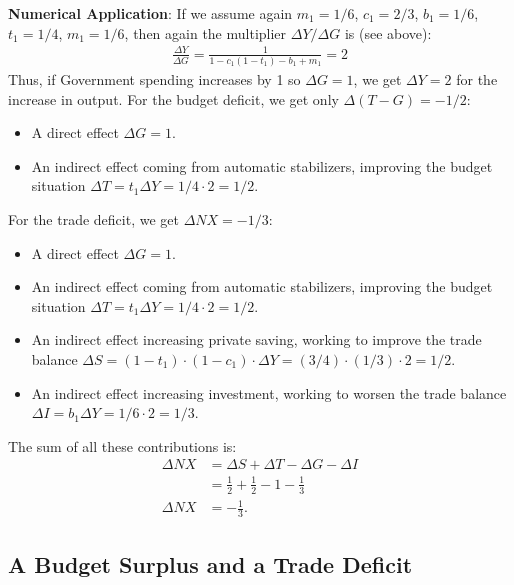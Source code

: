 \documentclass[]{book}
\providecommand{\tightlist}{%
  \setlength{\itemsep}{0pt}\setlength{\parskip}{0pt}}
\theoremstyle{definition}
\theoremstyle{definition}
\theoremstyle{definition}
\theoremstyle{remark}
\begin{document}
\textbf{Numerical Application}: If we assume again \(m_1=1/6\),
\(c_1=2/3\), \(b_1=1/6\), \(t_1=1/4\), \(m_1=1/6\), then again the
multiplier \(\Delta Y/\Delta G\) is (see above): \[
\begin{aligned}
\frac{\Delta Y}{\Delta G}=\frac{1}{1-c_1(1-t_1)-b_1+m_1}=2
\end{aligned}
\] Thus, if Government spending increases by 1 so \(\Delta G = 1\), we
get \(\Delta Y=2\) for the increase in output. For the budget deficit,
we get only \(\Delta(T-G)=-1/2\):

\begin{itemize}
\tightlist
\item
  A direct effect \(\Delta G=1\).
\item
  An indirect effect coming from automatic stabilizers, improving the
  budget situation \(\Delta T = t_1 \Delta Y =1/4\cdot2=1/2\).
\end{itemize}

For the trade deficit, we get \(\Delta NX = -1/3\):

\begin{itemize}
\tightlist
\item
  A direct effect \(\Delta G=1\).
\item
  An indirect effect coming from automatic stabilizers, improving the
  budget situation \(\Delta T = t_1 \Delta Y =1/4\cdot2=1/2\).
\item
  An indirect effect increasing private saving, working to improve the
  trade balance
  \(\Delta S = (1-t_1)\cdot(1-c_1)\cdot\Delta Y=(3/4)\cdot( 1/3) \cdot 2=1/2\).
\item
  An indirect effect increasing investment, working to worsen the trade
  balance \(\Delta I = b_1 \Delta Y = 1/6\cdot 2 = 1/3\).
\end{itemize}

The sum of all these contributions is: \[
\begin{aligned}
\Delta NX&=\Delta S + \Delta T-\Delta G-\Delta I\\
&=\frac{1}{2}+\frac{1}{2}-1-\frac{1}{3}\\
\Delta NX&=-\frac{1}{3}.
\end{aligned}
\]

\subsection{A Budget Surplus and a Trade
Deficit}\label{a-budget-surplus-and-a-trade-deficit}
\end{document}
